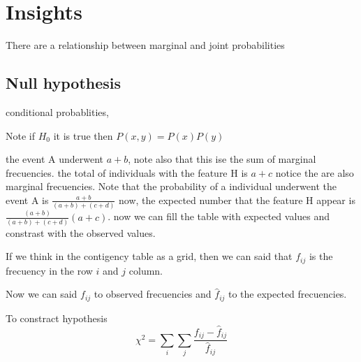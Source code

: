 \documentclass[10pt,a4paper]{article}
\begin{document}
\begin{comment}
yardstick: Criterio
https://latex-tutorial.com/tutorials/tables/ 
    relatedness: parentezco
    digress:divagar
    dull:aburrido
    fashionable: de moda, elegante
    gaze: mirada
    assured:asegurado
    wouldn't (s) no lo haría guedent
    noteworthy:notable nordguordy
    dissapointing: desepcionante
    Nominal variables Crammer's V
    purcell:
    misuse: mal u so
    prevail(s): prevalecer
    inward: interior.
    napkin: servilleta.
    cumbersome: incómodo.
    customary:acostumbrado
    foreshadowing: presagio.
    hatch: incubar
    
    
    
    
 see harvardar probability 19
 
    

\end{comment}


\section{Insights}
There are a relationship between marginal and
joint probabilities 

\subsection{Null hypothesis}

conditional probablities, 

Note if $H_{0}$ it is true then $P(x,y)= P(x)P(y)$ 


the event A underwent $a+b$, note also that 
this ise the sum of marginal frecuencies.
the total of individuals with the feature H is
$a+c$ notice the are also marginal frecuencies.
Note that the probability of a individual underwent the event A is $\frac{a+b}{(a+b)+(c+d)}$ 
now, the expected number that the feature H appear is $ \frac{(a+b)}{(a+b)+(c+d)} (a+c)$.
now we can fill the table with expected values and constrast with the observed values.

If we think in the contigency table as a grid, then we can said that $f_{ij}$ is the frecuency in the row $i$ and $j$ column.

Now we can said $f_{ij}$ to observed frecuencies and $\hat{f}_{ij}$ to the expected frecuencies.

To constract hypothesis 
\begin{equation}
    \chi^{2} = \sum_{i}\sum_{j} \frac{f_{ij}-\hat{f}_{ij}}{\hat{f}_{ij}}
\end{equation}
\end{document}
